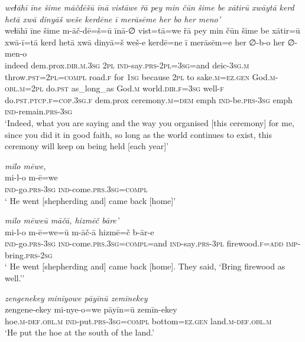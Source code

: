 \ea \label{ZP.128}
\textit{weɫāhī īne šime māčdēšū īnā vistāwe řā pey min čūn šime be xātirū xwāytā kerd hetā xwā dinyāš weše kerdēne ī merāsēme her bo her meno’} \\ 
\gll weɫāhī īne šime m-āč-dē=š=ū īnā-∅ vist=tā=we řā pey min čūn šime be xātir=ū xwā-ī=tā kerd hetā xwā dinyā=š weš-e kerdē=ne ī merāsēm=e her ∅-b-o her ∅-men-o \\ 
 indeed dem.prox\textsc{.dir}\textsc{.m}\textsc{.3sg} \textsc{2pl} \textsc{ind-}say\textsc{.prs}-\textsc{2pl}\textsc{=3sg}=and deic\textsc{-3sg}\textsc{.m} throw\textsc{.pst}=\textsc{2pl}\textsc{=compl} road\textsc{.f} for \textsc{1sg} because \textsc{2pl} to sake\textsc{.m}\textsc{\textsc{=ez.gen}} God\textsc{.m}\textsc{-obl}\textsc{.m}=\textsc{2pl} do\textsc{.pst} as\_long\_as God\textsc{.m} world\textsc{.dir}\textsc{.f}\textsc{=3sg} well\textsc{-f} do\textsc{.pst}\textsc{.ptcp}\textsc{.f}\textsc{=cop}\textsc{.3sg}\textsc{.f} dem.prox ceremony\textsc{.m}\textsc{=dem} emph \textsc{ind-}be\textsc{.prs}\textsc{-3sg} emph \textsc{ind-}remain\textsc{.prs}\textsc{-3sg} \\ 
\glt `Indeed, what you are saying and the way you organised [this ceremony] for me, since you did it in good faith, so long as the world continues to exist, this ceremony will keep on being held [each year]'
\z 
 
\ea \label{ŽP.23}
\textit{milo mēwe,} \\ 
\gll mi-l-o m-ē=we \\ 
 \textsc{ind-}go\textsc{.prs}\textsc{-3sg} \textsc{ind-}come\textsc{.prs}\textsc{.3sg}\textsc{=compl} \\ 
\glt ` He went [shepherding and] came back [home]'
\z 
 
\ea \label{ŽP.24}
\textit{milo mēweū māčā, hizmēč bāre’} \\ 
\gll mi-l-o m-ē=we=ū m-āč-ā hizmē=č b-ār-e \\ 
 \textsc{ind-}go\textsc{.prs}\textsc{-3sg} \textsc{ind-}come\textsc{.prs}\textsc{.3sg}\textsc{=compl}=and \textsc{ind-}say\textsc{.prs}\textsc{-3pl} firewood\textsc{.f}\textsc{=add} \textsc{imp-}bring\textsc{.prs}-\textsc{2sg} \\ 
\glt ` He went [shepherding and] came back [home]. They said, ‘Bring firewood as well.’'
\z 
 
\ea \label{ŽP.34}
\textit{zengenekey minīyowe pāyīnū zemīnekey} \\ 
\gll zengene-ekey mi-nye-o=we pāyīn=ū zemīn-ekey \\ 
 hoe\textsc{.m}\textsc{-def}\textsc{.obl}\textsc{.m} \textsc{ind-}put\textsc{.prs}\textsc{-3sg}\textsc{=compl} bottom\textsc{\textsc{=ez.gen}} land\textsc{.m}\textsc{-def}\textsc{.obl}\textsc{.m} \\ 
\glt `He put the hoe at the south of the land.'
\z 
 
